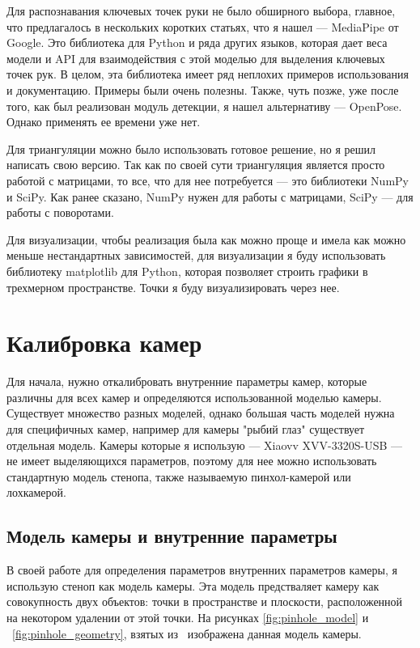 \documentclass[12pt, a4paper]{article}
\begin{document}
Для распознавания ключевых точек руки не было обширного выбора, главное, что
предлагалось в нескольких коротких статьях, что я нашел --- MediaPipe от
Google\cite{mediapipe_paper}. Это библиотека для Python и ряда других языков,
которая дает веса модели и API для взаимодействия с этой моделью для выделения
ключевых точек рук. В целом, эта библиотека имеет ряд неплохих примеров
использования и документацию. Примеры были очень полезны.
Также, чуть позже, уже после того, как был реализован модуль детекции, я нашел
альтернативу --- OpenPose. Однако применять ее времени уже нет.

Для триангуляции можно было использовать готовое решение, но я решил написать
свою версию. Так как по своей сути триангуляция является просто работой с
матрицами, то все, что для нее потребуется --- это библиотеки NumPy и SciPy.
Как ранее сказано, NumPy нужен для работы с матрицами, SciPy --- для работы с
поворотами.

Для визуализации, чтобы реализация была как можно проще и имела как можно
меньше нестандартных зависимостей, для визуализации я буду использовать
библиотеку matplotlib для Python, которая позволяет строить графики в
трехмерном пространстве. Точки я буду визуализировать через нее.

\section{Калибровка камер}
Для начала, нужно откалибровать внутренние параметры камер, которые различны
для всех камер и определяются использованной моделью камеры. Существует
множество разных моделей, однако большая часть моделей нужна для специфичных
камер, например для камеры "рыбий глаз" существует отдельная модель. Камеры
которые я использую --- Xiaovv XVV-3320S-USB --- не имеет выделяющихся
параметров, поэтому для нее можно использовать стандартную модель стенопа,
также называемую пинхол-камерой или лохкамерой.

\subsection{Модель камеры и внутренние параметры}
\label{sec:camera_model} 
В своей работе для определения параметров внутренних
параметров камеры, я использую стеноп как модель камеры. Эта модель
предстваляет камеру как совокупность двух объектов: точки в пространстве и
плоскости, расположенной на некотором удалении от этой точки. На рисунках
\ref{fig:pinhole_model} и
~\ref{fig:pinhole_geometry}, взятых из~\cite{multiview_cv} изображена данная
модель камеры.
\end{document}

